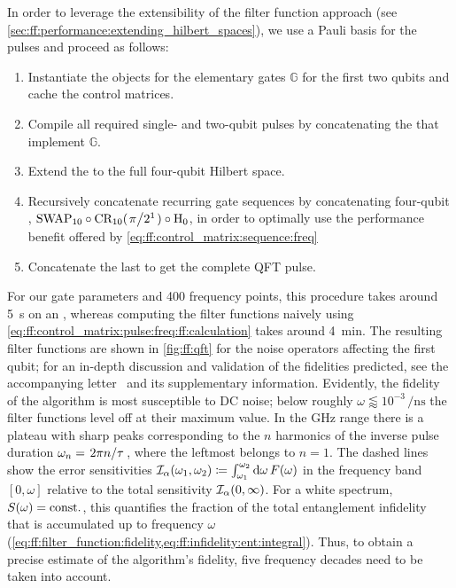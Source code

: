 In order to leverage the extensibility of the filter function approach (see \cref{sec:ff:performance:extending_hilbert_spaces}), we use a Pauli basis for the pulses and proceed as follows:
\begin{enumerate}
    \item Instantiate the \pulsesequence objects for the elementary gates $\mathbb{G}$ for the first two qubits and cache the control matrices.
    \item Compile all required single- and two-qubit pulses by concatenating the \pulsesequences that implement $\mathbb{G}$.
    \item Extend the \pulsesequences to the full four-qubit Hilbert space.
    \item Recursively concatenate recurring gate sequences by concatenating four-qubit \pulsesequences, \eg $\mr{SWAP}_{10}\circ\mr{CR_{10}}(\flatfrac{\pi}{2^1})\circ\mr{H}_0$, in order to optimally use the performance benefit offered by \cref{eq:ff:control_matrix:sequence:freq}
    \item Concatenate the last \pulsesequences to get the complete QFT pulse.
\end{enumerate}
For our gate parameters and \num{400} frequency points, this procedure takes around \qty{5}{\second} on an \fastprocessor, whereas computing the filter functions naively using \cref{eq:ff:control_matrix:pulse:freq:ff:calculation} takes around \qty{4}{\minute}.
The resulting filter functions are shown in \cref{fig:ff:qft} for the noise operators affecting the first qubit; for an in-depth discussion and validation of the fidelities predicted, see the accompanying letter~ and its supplementary information.
Evidently, the fidelity of the algorithm is most susceptible to DC noise; below roughly $\omega\lessapprox 10^{-3}\,\si{\per\nano\second}$ the filter functions level off at their maximum value.
In the \si{\giga\hertz} range there is a plateau with sharp peaks corresponding to the $n$ harmonics of the inverse pulse duration $\omega_n = \flatfrac{2\pi n}{\tau}$, where the leftmost belongs to $n=1$.
The dashed lines show the error sensitivities $\mathcal{I}_\alpha(\omega_1, \omega_2)\coloneqq\int_{\omega_1}^{\omega_2}\dd{\omega}F(\omega)$ in the frequency band $[0, \omega]$ relative to the total sensitivity $\mathcal{I}_\alpha(0,\infty)$.
For a white spectrum, \ie $S(\omega)=\mathrm{const.}$, this quantifies the fraction of the total entanglement infidelity that is accumulated up to frequency $\omega$ (\cf \cref{eq:ff:filter_function:fidelity,eq:ff:infidelity:ent:integral}).
Thus, to obtain a precise estimate of the algorithm's fidelity, five frequency decades need to be taken into account.

